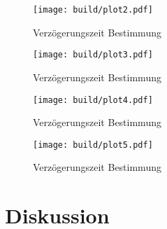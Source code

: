 \begin{figure}[H]
	\centering
	\texttt{[image: build/plot2.pdf]}
	\caption{Verzögerungszeit Bestimmung}\label{fig:plt2}
\end{figure}

\begin{figure}[H]
	\centering
	\texttt{[image: build/plot3.pdf]}
	\caption{Verzögerungszeit Bestimmung}\label{fig:plt3}
\end{figure}

\begin{figure}[H]
	\centering
	\texttt{[image: build/plot4.pdf]}
	\caption{Verzögerungszeit Bestimmung}\label{fig:plt4}
\end{figure}

\begin{figure}[H]
	\centering
	\texttt{[image: build/plot5.pdf]}
	\caption{Verzögerungszeit Bestimmung}\label{fig:plt5}
\end{figure}



\section{Diskussion}


\newpage
\printbibliography

